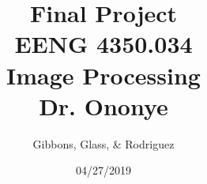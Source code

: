 \documentclass{article}
\title{Final Project \\ EENG 4350.034 \\ Image Processing \\ Dr. Ononye}
\author{Gibbons, Glass, \& Rodriguez}
\date{04/27/2019}
\begin{document}
\maketitle


\hfill \\
\hfill \\
\hfill \\
\hfill \\
\hfill \\
\hfill \\
\hfill \\
\hfill \\
\hfill \\
\hfill \\
\hfill \\
\hfill \\
\hfill \\
\hfill \\
\hfill \\
\hfill \\
\hfill \\
\hfill \\
\hfill \\
\hfill \\
\hfill \\
\hfill \\
\hfill \\
\hfill \\
\hfill \\
\hfill \\
\hfill \\
\hfill \\
\hfill \\
\hfill \\

\begin{abstract}

%
%
%
%


\end{abstract}
\end{document}
